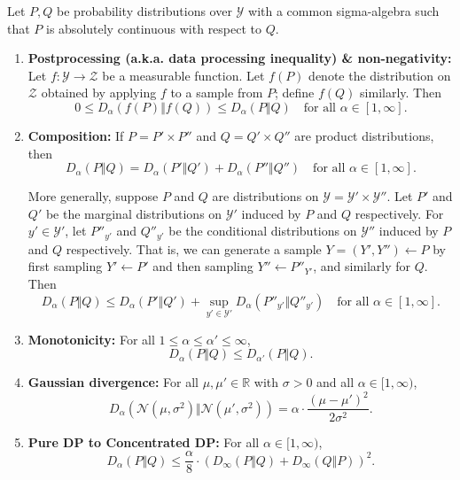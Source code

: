 \documentclass[10pt]{article}
\begin{document}
\begin{ginzabox}[Properties]
 Let $P, Q$ be probability distributions over $\mathcal{Y}$ with a common sigma-algebra such that $P$ is absolutely continuous with respect to $Q$.
\begin{enumerate}
    \item \textbf{Postprocessing (a.k.a. data processing inequality) \& non-negativity:} \\
    Let $f : \mathcal{Y} \rightarrow \mathcal{Z}$ be a measurable function. Let $f(P)$ denote the distribution on $\mathcal{Z}$ obtained by applying $f$ to a sample from $P$; define $f(Q)$ similarly. Then
    \[
    0 \leq D_\alpha(f(P) \Vert f(Q)) \leq D_\alpha(P \Vert Q) \quad \text{for all } \alpha \in [1, \infty].
    \]

    \item \textbf{Composition:} If $P = P' \times P''$ and $Q = Q' \times Q''$ are product distributions, then
    \[
    D_\alpha(P \Vert Q) = D_\alpha(P' \Vert Q') + D_\alpha(P'' \Vert Q'') \quad \text{for all } \alpha \in [1, \infty].
    \]

    More generally, suppose $P$ and $Q$ are distributions on $\mathcal{Y} = \mathcal{Y}' \times \mathcal{Y}''$. Let $P'$ and $Q'$ be the marginal distributions on $\mathcal{Y}'$ induced by $P$ and $Q$ respectively. For $y' \in \mathcal{Y}'$, let $P''_{y'}$ and $Q''_{y'}$ be the conditional distributions on $\mathcal{Y}''$ induced by $P$ and $Q$ respectively. That is, we can generate a sample $Y = (Y', Y'') \leftarrow P$ by first sampling $Y' \leftarrow P'$ and then sampling $Y'' \leftarrow P''_{Y'}$, and similarly for $Q$. Then
    \[
    D_\alpha(P \Vert Q) \leq D_\alpha(P' \Vert Q') + \sup_{y' \in \mathcal{Y}'} D_\alpha(P''_{y'} \Vert Q''_{y'}) \quad \text{for all } \alpha \in [1, \infty].
    \]

    \item \textbf{Monotonicity:} For all $1 \leq \alpha \leq \alpha' \leq \infty$,
    \[
    D_\alpha(P \Vert Q) \leq D_{\alpha'}(P \Vert Q).
    \]

    \item \textbf{Gaussian divergence:} For all $\mu, \mu' \in \mathbb{R}$ with $\sigma > 0$ and all $\alpha \in [1, \infty)$,
    \[
    D_\alpha(\mathcal{N}(\mu, \sigma^2) \Vert \mathcal{N}(\mu', \sigma^2)) = \alpha \cdot \frac{(\mu - \mu')^2}{2\sigma^2}.
    \]

    \item \textbf{Pure DP to Concentrated DP:} For all $\alpha \in [1, \infty)$,
    \[
    D_\alpha(P \Vert Q) \leq \frac{\alpha}{8} \cdot \left(D_\infty(P \Vert Q) + D_\infty(Q \Vert P)\right)^2.
    \]


\end{enumerate}
\end{ginzabox}
\end{document}

